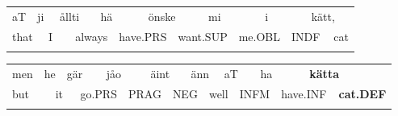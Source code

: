 \begin{tabular}{llllllllllllllll}
\lsptoprule
aT & \multicolumn{2}{l}{ji

} & \multicolumn{2}{l}{ållti

} & \multicolumn{2}{l}{hä

} & \multicolumn{2}{l}{önske

} & \multicolumn{2}{l}{mi

} & \multicolumn{2}{l}{i

} & \multicolumn{2}{l}{kätt,

} & \\
\multicolumn{2}{l}{that

} & \multicolumn{2}{l}{I

} & \multicolumn{2}{l}{always

} & \multicolumn{2}{l}{have.PRS

} & \multicolumn{2}{l}{want.SUP

} & \multicolumn{2}{l}{me.OBL

} & \multicolumn{2}{l}{INDF

} & \multicolumn{2}{l}{cat

}\\
\lspbottomrule
\end{tabular}

\begin{tabular}{llllllllllllllllll}
\lsptoprule
men & \multicolumn{2}{l}{he

} & \multicolumn{2}{l}{gär

} & \multicolumn{2}{l}{jåo

} & \multicolumn{2}{l}{äint

} & \multicolumn{2}{l}{änn

} & \multicolumn{2}{l}{aT

} & \multicolumn{2}{l}{ha

} & \multicolumn{2}{l}{{\bfseries kätta}

} & \\
\multicolumn{2}{l}{but

} & \multicolumn{2}{l}{it

} & \multicolumn{2}{l}{go.PRS

} & \multicolumn{2}{l}{PRAG

} & \multicolumn{2}{l}{NEG

} & \multicolumn{2}{l}{well

} & \multicolumn{2}{l}{INFM

} & \multicolumn{2}{l}{have.INF

} & \multicolumn{2}{l}{{\bfseries cat.DEF}

}\\
\lspbottomrule
\end{tabular}

